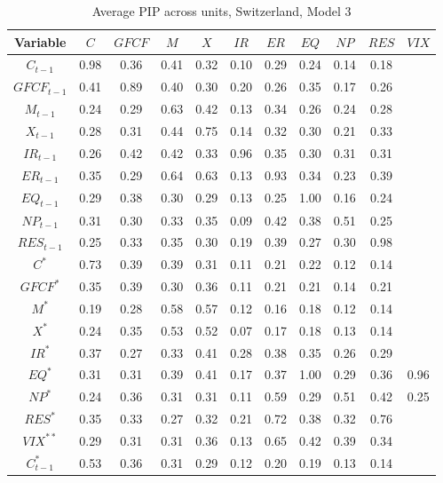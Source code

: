 \documentclass[a4paper, twoside]{templates/ociamthesis}
\begin{document}
\clearpage

\begin{table}[!ht]

\caption{\label{tab:Table55CH3}Average PIP across units, Switzerland, Model 3}
\centering
\fontsize{6}{8}\selectfont
\begin{tabular}[t]{ccccccccccc}
\toprule
Variable & $C$ & $GFCF$ & $M$ & $X$ & $IR$ & $ER$ & $EQ$ & $NP$ & $RES$ & $VIX$\\
\midrule
$C_{t-1}$ & 0.98 & 0.36 & 0.41 & 0.32 & 0.10 & 0.29 & 0.24 & 0.14 & 0.18 & \\
$GFCF_{t-1}$ & 0.41 & 0.89 & 0.40 & 0.30 & 0.20 & 0.26 & 0.35 & 0.17 & 0.26 & \\
$M_{t-1}$ & 0.24 & 0.29 & 0.63 & 0.42 & 0.13 & 0.34 & 0.26 & 0.24 & 0.28 & \\
$X_{t-1}$ & 0.28 & 0.31 & 0.44 & 0.75 & 0.14 & 0.32 & 0.30 & 0.21 & 0.33 & \\
$IR_{t-1}$ & 0.26 & 0.42 & 0.42 & 0.33 & 0.96 & 0.35 & 0.30 & 0.31 & 0.31 & \\
$ER_{t-1}$ & 0.35 & 0.29 & 0.64 & 0.63 & 0.13 & 0.93 & 0.34 & 0.23 & 0.39 & \\
$EQ_{t-1}$ & 0.29 & 0.38 & 0.30 & 0.29 & 0.13 & 0.25 & 1.00 & 0.16 & 0.24 & \\
$NP_{t-1}$ & 0.31 & 0.30 & 0.33 & 0.35 & 0.09 & 0.42 & 0.38 & 0.51 & 0.25 & \\
$RES_{t-1}$ & 0.25 & 0.33 & 0.35 & 0.30 & 0.19 & 0.39 & 0.27 & 0.30 & 0.98 & \\
$C^*$ & 0.73 & 0.39 & 0.39 & 0.31 & 0.11 & 0.21 & 0.22 & 0.12 & 0.14 & \\
$GFCF^*$ & 0.35 & 0.39 & 0.30 & 0.36 & 0.11 & 0.21 & 0.21 & 0.14 & 0.21 & \\
$M^*$ & 0.19 & 0.28 & 0.58 & 0.57 & 0.12 & 0.16 & 0.18 & 0.12 & 0.14 & \\
$X^*$ & 0.24 & 0.35 & 0.53 & 0.52 & 0.07 & 0.17 & 0.18 & 0.13 & 0.14 & \\
$IR^*$ & 0.37 & 0.27 & 0.33 & 0.41 & 0.28 & 0.38 & 0.35 & 0.26 & 0.29 & \\
$EQ^*$ & 0.31 & 0.31 & 0.39 & 0.41 & 0.17 & 0.37 & 1.00 & 0.29 & 0.36 & 0.96\\
$NP^*$ & 0.24 & 0.36 & 0.31 & 0.31 & 0.11 & 0.59 & 0.29 & 0.51 & 0.42 & 0.25\\
$RES^*$ & 0.35 & 0.33 & 0.27 & 0.32 & 0.21 & 0.72 & 0.38 & 0.32 & 0.76 & \\
$VIX^{**}$ & 0.29 & 0.31 & 0.31 & 0.36 & 0.13 & 0.65 & 0.42 & 0.39 & 0.34 & \\
$C^*_{t-1}$ & 0.53 & 0.36 & 0.31 & 0.29 & 0.12 & 0.20 & 0.19 & 0.13 & 0.14 & \\

\end{tabular}
\end{table}
\end{document}
